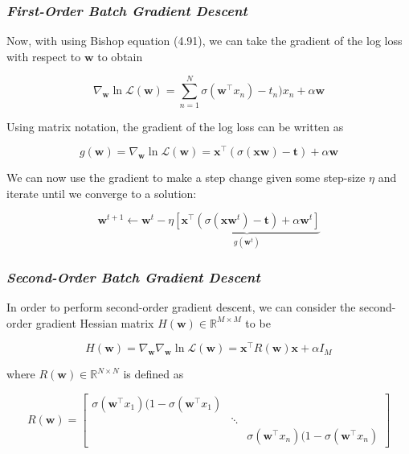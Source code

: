 \documentclass[11pt]{extarticle}
\begin{document}
\subsubsection{\textit{First-Order Batch Gradient Descent}}

Now, with using Bishop equation (4.91), we can take the gradient of the log loss with respect to $\mathbf{w}$ to obtain

\begin{equation}
     \nabla_\mathbf{w} \ln \mathcal{L}(\mathbf{w}) =  \sum_{n=1}^N \sigma(\textbf{w}^\top x_n) - t_n)x_n + \alpha \mathbf{w}
\end{equation}

Using matrix notation, the gradient of the log loss can be written as

\begin{equation}
     g(\mathbf{w}) = \nabla_\mathbf{w} \ln \mathcal{L}(\mathbf{w}) =  \mathbf{x}^\top (\sigma(\mathbf{x} \textbf{w}) - \mathbf{t}) + \alpha \mathbf{w}
\end{equation}

We can now use the gradient to make a step change given some step-size $\eta$ and iterate until we converge to a solution:

\begin{equation}
\mathbf{w}^{t+1} \leftarrow \mathbf{w}^{t} - \eta \underbrace{\left[ \mathbf{x}^\top (\sigma(\mathbf{x} \textbf{w}^t) - \mathbf{t}) + \alpha \mathbf{w}^t \right]}_{g(\mathbf{w}^t)}
\end{equation}

\subsubsection{\textit{Second-Order Batch Gradient Descent}}

In order to perform second-order gradient descent, we can consider the second-order gradient Hessian matrix $H(\mathbf{w}) \in \mathbb{R}^{M \times M}$ to be

\begin{equation}
H(\mathbf{w}) = \nabla_\mathbf{w} \nabla_\mathbf{w} \ln \mathcal{L}(\mathbf{w})  = \mathbf{x}^\top R(\mathbf{w}) \mathbf{x} + \alpha I_M
\end{equation}

where $R(\mathbf{w}) \in \mathbb{R}^{N \times N}$ is defined as

\begin{equation}
R(\mathbf{w}) =
  \begin{bmatrix}
    \sigma(\textbf{w}^\top x_1)(1-\sigma(\textbf{w}^\top x_1) & & \\
    & \ddots & \\
    & & \sigma(\textbf{w}^\top x_n)(1-\sigma(\textbf{w}^\top x_n)
  \end{bmatrix}
\end{equation}
\end{document}
